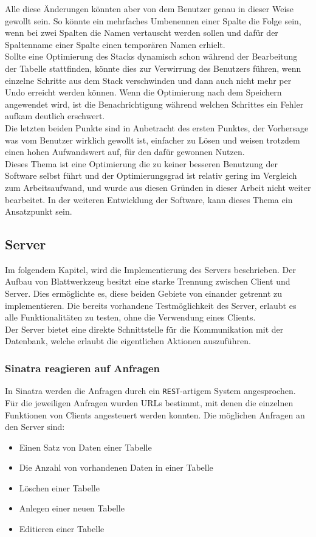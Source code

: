 \begin{description}
Alle diese Änderungen könnten aber von dem Benutzer genau in dieser Weise gewollt sein. So könnte ein mehrfaches Umbenennen einer Spalte die Folge sein, wenn bei zwei Spalten die Namen vertauscht werden sollen und dafür der Spaltenname einer Spalte einen temporären Namen erhielt. \\
Sollte eine Optimierung des Stacks dynamisch schon während der Bearbeitung der Tabelle stattfinden, könnte dies zur Verwirrung des Benutzers führen, wenn einzelne Schritte aus dem Stack verschwinden und dann auch nicht mehr per Undo erreicht werden können.
Wenn die Optimierung nach dem Speichern angewendet wird, ist die Benachrichtigung während welchen Schrittes ein Fehler aufkam deutlich erschwert. \\
Die letzten beiden Punkte sind in Anbetracht des ersten Punktes, der Vorhersage was vom Benutzer wirklich gewollt ist, einfacher zu Lösen und weisen trotzdem einen hohen Aufwandswert auf, für den dafür gewonnen Nutzen. \\
Dieses Thema ist eine Optimierung die zu keiner besseren Benutzung der Software selbst führt und der Optimierungsgrad ist relativ gering im Vergleich zum Arbeitsaufwand, und wurde aus diesen Gründen in dieser Arbeit nicht weiter bearbeitet. In der weiteren Entwicklung der Software, kann dieses Thema ein Ansatzpunkt sein. 
\end{description}




\newpage
\subsection{Server}
\label{subsec04:server}
Im folgendem Kapitel, wird die Implementierung des Servers beschrieben. Der Aufbau von Blattwerkzeug besitzt eine starke Trennung zwischen Client und Server. Dies ermöglichte es, diese beiden Gebiete von einander getrennt zu implementieren. Die bereits vorhandene Testmöglichkeit des Server, erlaubt es alle Funktionalitäten zu testen, ohne die Verwendung eines Clients. \\
Der Server bietet eine direkte Schnittstelle für die Kommunikation mit der Datenbank, welche erlaubt die eigentlichen Aktionen auszuführen.

\subsubsection{Sinatra reagieren auf Anfragen}
\label{subsubsec04:sinatra_client_reaction}
In Sinatra werden die Anfragen durch ein \texttt{REST}-artigem System angesprochen.
Für die jeweiligen Anfragen wurden URLs bestimmt, mit denen die einzelnen Funktionen von Clients angesteuert werden konnten.
Die möglichen Anfragen an den Server sind:
\begin{itemize}
    \item Einen Satz von Daten einer Tabelle
    \item Die Anzahl von vorhandenen Daten in einer Tabelle
    \item Löschen einer Tabelle
    \item Anlegen einer neuen Tabelle
    \item Editieren einer Tabelle
\end{itemize}


